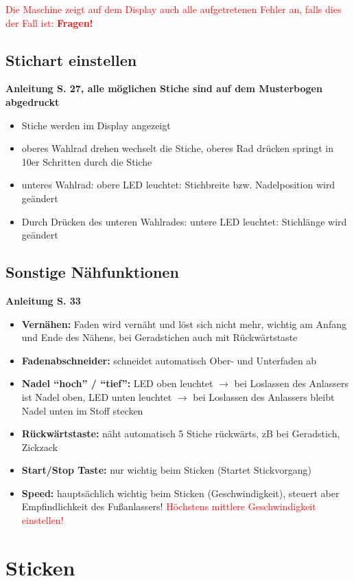 \documentclass{\basedir/fablab-document}
\begin{document}
\textcolor{red}{Die Maschine zeigt auf dem Display auch alle aufgetretenen Fehler an, falls dies der Fall ist: \textbf{Fragen!}}


\subsection{Stichart einstellen}
\textbf{Anleitung S. 27, alle möglichen Stiche sind auf dem Musterbogen abgedruckt}
\begin{itemize}
 \item Stiche werden im Display angezeigt
 \item oberes Wahlrad drehen wechselt die Stiche, oberes Rad drücken springt in 10er Schritten durch die Stiche
 \item unteres Wahlrad: obere LED leuchtet: Stichbreite bzw. Nadelposition wird geändert
 \item Durch Drücken des unteren Wahlrades: untere LED leuchtet: Stichlänge wird geändert
\end{itemize}

\subsection{Sonstige Nähfunktionen}
\textbf{Anleitung S. 33}
\begin{itemize}
 \item \textbf{Vernähen:} Faden wird vernäht und löst sich nicht mehr, wichtig am Anfang und Ende des Nähens, bei Geradstichen auch mit Rückwärtstaste
 \item \textbf{Fadenabschneider:} schneidet automatisch Ober- und Unterfaden ab
 \item \textbf{Nadel ``hoch'' / ``tief'':} LED oben leuchtet $\rightarrow$ bei Loslassen des Anlassers ist Nadel oben, LED unten leuchtet $\rightarrow$ bei Loslassen des Anlassers bleibt Nadel unten im Stoff stecken 
 \item \textbf{Rückwärtstaste:} näht automatisch 5 Stiche rückwärts, zB bei Geradstich, Zickzack
 \item \textbf{Start/Stop Taste:} nur wichtig beim Sticken (Startet Stickvorgang)
 \item \textbf{Speed:} hauptsächlich wichtig beim Sticken (Geschwindigkeit), steuert aber Empfindlichkeit des Fußanlassers! \textcolor{red}{Höchstens mittlere Geschwindigkeit einstellen!}
\end{itemize}

\pagebreak
\section{Sticken}
\end{document}
